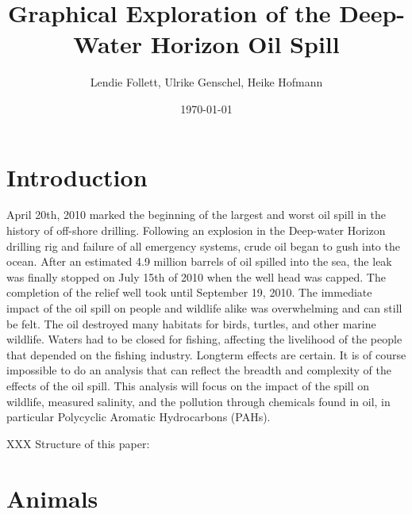 \documentclass[11pt]{article}
\title{Graphical Exploration of the Deep-Water Horizon Oil Spill}
\author{Lendie Follett, Ulrike Genschel, Heike Hofmann}
\date{\today}                                           %
\begin{document}
\maketitle
\begin{abstract}
\end{abstract}
\section{Introduction}
April 20th, 2010 marked the beginning of the largest and worst oil spill in the history of off-shore drilling.  Following an explosion in the Deep-water Horizon drilling rig and failure of all emergency systems, crude oil began to gush into the ocean.  After an estimated 4.9 million barrels of oil spilled into the sea, the leak was finally stopped on July 15th of 2010 when the well head was capped.  The completion of the relief well took until September 19, 2010.  The immediate impact of the oil spill on people and wildlife alike was overwhelming and can still be felt.  The oil destroyed many habitats for birds, turtles, and other marine wildlife.  Waters had to be closed for fishing, affecting the livelihood of the people that depended on the fishing industry.  Longterm effects are certain.  It is of course impossible to do an analysis that can reflect the breadth and complexity of the effects of the oil spill.  This analysis will focus on the impact of the spill on wildlife, measured salinity, and the pollution through chemicals found in oil, in particular Polycyclic Aromatic Hydrocarbons (PAHs). 

XXX Structure of this paper:
\section{Animals}
\end{document}
